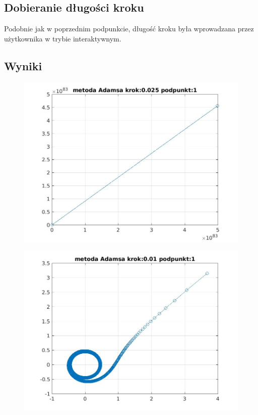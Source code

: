 \documentclass[a4paper, 11pt]{article}
\begin{document}
\subsection{Dobieranie długości kroku}
Podobnie jak w poprzednim podpunkcie, długość kroku była wprowadzana przez użytkownika w trybie interaktywnym. 

\subsection{Wyniki}
\begin{figure}[htp]
\centering
\includegraphics[width = 15cm]{2d/metoda Adamsa krok:0,025 podpunkt:1.jpg}
\end{figure}
\begin{figure}[htp]
\centering
\includegraphics[width = 15cm]{2d/metoda Adamsa krok:0,01 podpunkt:1.jpg}
\end{figure}
\end{document}
